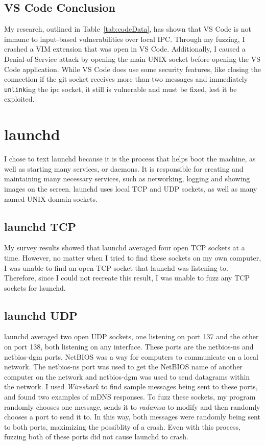 \subsection{VS Code Conclusion}
\label{sec:codeConclusion}
My research, outlined in Table~\ref{tab:codeData}, has shown that VS Code is not immune to input-based vulnerabilities over local IPC.  Through my fuzzing, I crashed a VIM extension that was open in VS Code.  Additionally, I caused a Denial-of-Service attack by opening the main UNIX socket before opening the VS Code application.  While VS Code does use some security features, like closing the connection if the git socket receives more than two messages and immediately \texttt{unlink}ing the ipc socket, it still is vulnerable and must be fixed, lest it be exploited.

\section{launchd}
\label{sec:launchd}
I chose to text launchd because it is the process that helps boot the machine, as well as starting many services, or daemons.  It is responsible for creating and maintaining many necessary services, such as networking, logging and showing images on the screen.  launchd uses local TCP and UDP sockets, as well as many named UNIX domain sockets.

\subsection{launchd TCP}
\label{sec:launchdTcp}
My survey results showed that launchd averaged four open TCP sockets at a time.  However, no matter when I tried to find these sockets on my own computer, I was unable to find an open TCP socket that launchd was listening to.  Therefore, since I could not recreate this result, I was unable to fuzz any TCP sockets for launchd.

\subsection{launchd UDP}
\label{sec:launchdUdp}
launchd averaged two open UDP sockets, one listening on port 137 and the other on port 138, both listening on any interface.  These ports are the netbios-ns and netbios-dgm ports.  NetBIOS was a way for computers to communicate on a local network.  The netbios-ns port was used to get the NetBIOS name of another computer on the network and netbios-dgm was used to send datagrams within the network.  I used \textit{Wireshark} to find sample messages being sent to these ports, and found two examples of mDNS responses.  To fuzz these sockets, my program randomly chooses one message, sends it to \textit{radamsa} to modify and then randomly chooses a port to send it to.  In this way, both messages were randomly being sent to both ports, maximizing the possiblity of a crash.  Even with this process, fuzzing both of these ports did not cause launchd to crash.

